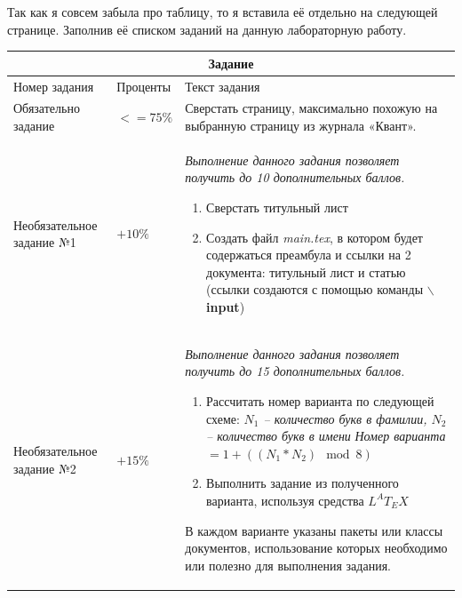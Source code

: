 \newpage
Так как я совсем забыла про таблицу, то я вставила её отдельно на следующей странице. 
Заполнив её списком заданий на данную лабораторную работу.
\begin{center}
	\begin{tabular}{|p{4cm}|p{2cm}|p{10cm}|}
		\hline
		\multicolumn{3}{|c|}{Задание} \\
		\hline
		Номер задания & Проценты & Текст задания \\
		\hline
		Обязательно задание & $<= 75\%$ & Сверстать страницу, максимально
		похожую на выбранную страницу из журнала «Квант». \\
		\hline
		Необязательное задание №1 & $+10\%$ & 
		\textit{Выполнение данного задания позволяет получить до 10
		дополнительных баллов.}
		\begin{enumerate}
			\item Сверстать титульный лист
			\item Создать файл \textit{main.tex}, в котором будет
			содержаться преамбула и ссылки на 2 документа: титульный 
			лист и статью (ссылки создаются с помощью команды 
			\textbf{$\backslash$input})
		\end{enumerate}\\
		\hline
		Необязательное задание №2 & $+15\%$ & 
		\textit{Выполнение данного задания позволяет получить до 15 
		дополнительных баллов.}
		\begin{enumerate}
			\item Рассчитать номер варианта по следующей схеме: \newline
			\textit{$N_1$ – количество букв в фамилии, $N_2$ – 
			количество букв в имени}
			\newline \textit{Номер варианта }$= 1 + \left(
			\left(N_1*N_2\right)\mod 8 \right)$
			\item Выполнить задание из полученного варианта, используя
			средства $L^AT_EX$
		\end{enumerate}
		В каждом варианте указаны пакеты или классы документов,
		использование которых необходимо или полезно для выполнения
		задания.\\
		\hline
	\end{tabular}
\end{center}
